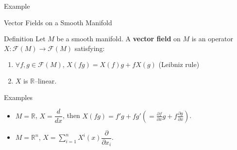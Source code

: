 \begin{frame}{Example}
    \begin{center}
\end{center}
\end{frame}


\begin{frame}{Vector Fields on a Smooth Manifold}
\begin{block}{Definition}
Let $M$ be a smooth manifold.
A \textbf{vector field} on $M$ is an operator $X:\mathcal{F}(M)\to\mathcal{F}(M)$ satisfying:
\begin{enumerate}
\item $\forall f,g\in\mathcal{F}(M)$, $X(fg)=X(f)g+fX(g)$ \hfill (Leibniz rule)
\item $X$ is $\mathbb{R}$–linear.
\end{enumerate}
\end{block}

\begin{exampleblock}{Examples}
\begin{itemize}
\item $M=\mathbb{R}$, $X=\dfrac{d}{dx}$, then $X(fg)=f'g+fg' (=\frac{\partial f}{\partial x}g + f\frac{\partial g}{\partial x})$.
\item $M=\mathbb{R}^n$, $X=\displaystyle\sum_{i=1}^{n} X^i(x)\dfrac{\partial}{\partial x_i}$.
\end{itemize}
\end{exampleblock}
\end{frame}


